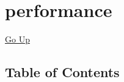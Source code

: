 \chapter*{\color{headtoc} performance}
\hypertarget{ecldoc:toc:root/performance}{}
\hyperlink{ecldoc:toc:root}{Go Up}


\section*{Table of Contents}
{\renewcommand{\arraystretch}{1.5}
\begin{longtable}{|p{\textwidth}|}
\hline
\end{longtable}
}

